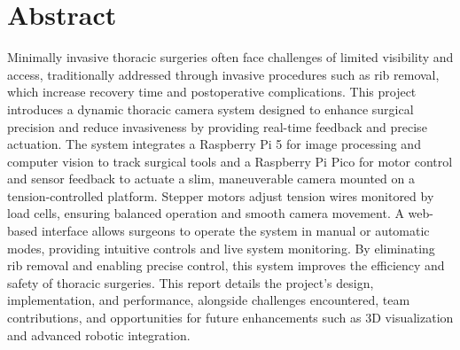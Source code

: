 \section{Abstract}
Minimally invasive thoracic surgeries often face challenges of limited visibility and access, traditionally addressed through invasive procedures such as rib removal, which increase recovery time and postoperative complications. This project introduces a dynamic thoracic camera system designed to enhance surgical precision and reduce invasiveness by providing real-time feedback and precise actuation. The system integrates a Raspberry Pi 5 for image processing and computer vision to track surgical tools and a Raspberry Pi Pico for motor control and sensor feedback to actuate a slim, maneuverable camera mounted on a tension-controlled platform. Stepper motors adjust tension wires monitored by load cells, ensuring balanced operation and smooth camera movement. A web-based interface allows surgeons to operate the system in manual or automatic modes, providing intuitive controls and live system monitoring. By eliminating rib removal and enabling precise control, this system improves the efficiency and safety of thoracic surgeries. This report details the project’s design, implementation, and performance, alongside challenges encountered, team contributions, and opportunities for future enhancements such as 3D visualization and advanced robotic integration.